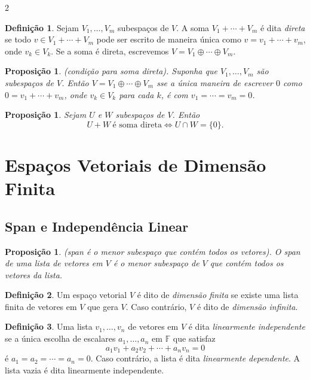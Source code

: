 \documentclass{article}
\theoremstyle{plain}
\newtheorem{prop}[thm]{Proposição}
\theoremstyle{definition}
\newtheorem{defn}{Definição}[section]
\theoremstyle{remark}
\begin{document}
\begin{multicols}{2}
\begin{defn}
    Sejam \(V_1, \ldots, V_m\) subespaços de \(V\). A soma \(V_1 + \cdots + V_m\) é dita \emph{direta} se todo \(v \in V_1 + \cdots + V_m\) pode ser escrito de maneira única como \(v = v_1 + \cdots + v_m\), onde \(v_k \in V_k\). Se a soma é direta, escrevemos \(V = V_1 \oplus \cdots \oplus V_m\).
\end{defn}

\begin{prop} (condição para soma direta).
    Suponha que \(V_1, \ldots, V_m\) são subespaços de \(V\). Então \(V = V_1 \oplus \cdots \oplus V_m\) sse a única maneira de escrever \(0\) como \(0 = v_1 + \cdots + v_m\), onde \(v_k \in V_k\) para cada \(k\), é com \(v_1 = \cdots = v_m = 0\).
\end{prop}

\begin{prop}
    Sejam \(U\) e \(W\) subespaços de \(V\). Então \[U + W \ \text{é soma direta} \iff U \cap W = \{0\}.\]
\end{prop}

\section{Espaços Vetoriais de Dimensão Finita}

\subsection{Span e Independência Linear}
\begin{prop} (span é o menor subespaço que contém todos os vetores).
    O span de uma lista de vetores em \(V\) é o menor subespaço de \(V\) que contém todos os vetores da lista.
\end{prop}

\begin{defn}
    Um espaço vetorial \(V\) é dito de \emph{dimensão finita} se existe uma lista finita de vetores em \(V\) que gera \(V\). Caso contrário, \(V\) é dito de \emph{dimensão infinita}.
\end{defn}

\begin{defn}
    Uma lista \(v_1, \ldots, v_n\) de vetores em \(V\) é dita \emph{linearmente independente} se a única escolha de escalares \(a_1, \ldots, a_n\) em \(\mathbb{F}\) que satisfaz
    \begin{equation}
        a_1 v_1 + a_2 v_2 + \cdots + a_n v_n = 0
    \end{equation}
    \noindent é \(a_1 = a_2 = \cdots = a_n = 0\). Caso contrário, a lista é dita \emph{linearmente dependente}. A lista vazia é dita linearmente independente.
\end{defn}


\end{multicols}
\end{document}
